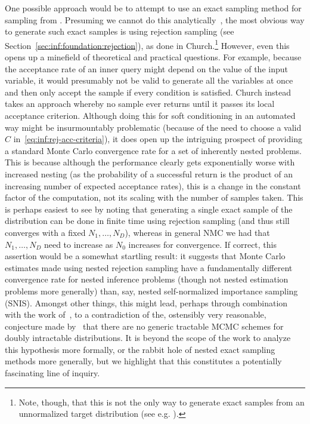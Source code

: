 One possible approach would be to attempt to
use an exact sampling method for sampling from \conditional. Presuming we cannot
do this analytically~\citep{cornish2017efficient}, the most obvious way to generate such exact
samples is using rejection sampling (see Section~\ref{sec:inf:foundation:rejection}), as done in
Church.\footnote{Note, though, that this
is not the only way to generate exact samples from an unnormalized target distribution (see e.g. \citep{craiu2011perfection}).}
However, even this opens up a minefield of theoretical
and practical questions.  For example, because the acceptance rate of an inner query might depend on the
value of the input variable, it would presumably not be valid to generate all the variables at once
and then only accept the sample if every condition is satisfied.
Church instead takes an approach whereby no sample ever returns until it passes its local acceptance criterion.
Although doing this for soft conditioning in an automated way might be insurmountably problematic (because of the
need to choose a valid $C$ in~\eqref{eq:inf:rej-acc-criteria}), it does open up the intriguing prospect
of providing a standard Monte Carlo convergence rate for a set of inherently nested problems.  This is because although the performance clearly
gets exponentially worse with increased nesting (as the probability of a successful return is the
product of an increasing number of expected acceptance rates), this is a change in the constant factor of the
computation, not its scaling with the number of samples taken.  This is perhaps easiest to see by noting that 
generating a single exact sample of the distribution
can be done in finite time using rejection sampling (and thus still converges with a fixed $N_1,\dots,N_D$), 
whereas in general NMC we had that $N_1,\dots,N_D$ need to increase as $N_0$ increases for convergence.
If correct, this assertion would be a somewhat startling result: it suggests that Monte Carlo 
estimates made using nested rejection sampling have a fundamentally different
convergence rate for nested inference problems (though not nested estimation problems more generally) than, say,
nested self-normalized importance sampling (SNIS).  Amongst other things, this might lead, 
perhaps through combination with 
the work of~\cite{moller2006efficient}, to a contradiction of the, ostensibly very reasonable, conjecture
made by~\cite{murray2004bayesian} that there are no generic tractable MCMC schemes for doubly intractable distributions.
It is beyond the scope of the work to analyze this hypothesis more formally, or the rabbit hole of
nested exact sampling methods more generally, but we highlight that this constitutes a potentially fascinating line of inquiry.


